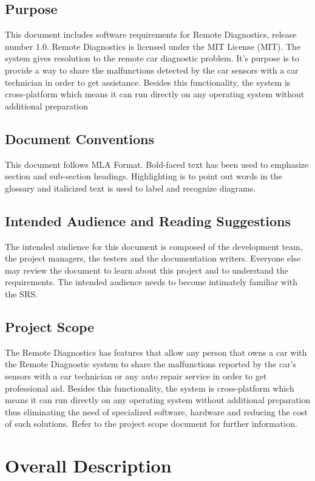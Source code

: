 \documentclass{scrreprt}
\begin{document}
\section{Purpose}
This document includes software requirements for Remote Diagnostics,
release number 1.0. Remote Diagnostics is licensed under the MIT License (MIT).
The system gives resolution to the remote car diagnostic problem.
It's purpose is to provide a way to share the malfunctions detected
by the car sensors with a car technician in order to get assistance.
Besides this functionality, the system is cross-platform which means
it can run directly on any operating system without additional preparation


\section{Document Conventions}
This document follows MLA Format. Bold-faced text has been used to emphasize section
and sub-section headings. Highlighting is to point out words in the glossary and italicized text is
used to label and recognize diagrams.

\section{Intended Audience and Reading Suggestions}
The intended audience for this document is composed of the development team, the project managers,
the testers and the documentation writers.
Everyone else may review the document to learn about this project and to understand the requirements.
The intended audience needs to become intimately familiar with the SRS.

\section{Project Scope}
The Remote Diagnostics has features that allow any person that owns a car with the Remote Diagnostic system
to share the malfunctions reported by the car's sensors with a car technician or any auto repair service in order
to get professional aid. Besides this functionality, the system is cross-platform which means
it can run directly on any operating system without additional preparation thus eliminating the need of specialized
software, hardware and reducing the cost of such solutions. Refer to the project scope document for further information.


\chapter{Overall Description}
\end{document}
